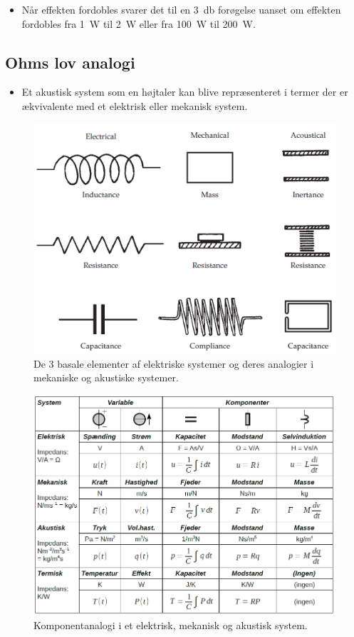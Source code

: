 \begin{itemize}
	\item Når effekten fordobles svarer det til en \SI{3}{\decibel} forøgelse uanset om effekten fordobles fra \SI{1}{\watt} til \SI{2}{\watt} eller fra \SI{100}{\watt} til \SI{200}{\watt}.
\end{itemize}

\subsection{Ohms lov analogi}
\begin{itemize}
	\item Et akustisk system som en højtaler kan blive repræsenteret i termer der er ækvivalente med et elektrisk eller mekanisk system. 
\end{itemize}

\begin{figure} [H]
	\centering
	\includegraphics[width=0.5\linewidth]{graphics/4.png}
	\caption{De 3 basale elementer af elektriske systemer og deres analogier i mekaniske og akustiske systemer.}
	\label{fig:4}
\end{figure}

\begin{figure} [H]
	\centering
	\includegraphics[width=\linewidth]{graphics/5.png}
	\caption{Komponentanalogi i et elektrisk, mekanisk og akustisk system.}
	\label{fig:5}
\end{figure}

